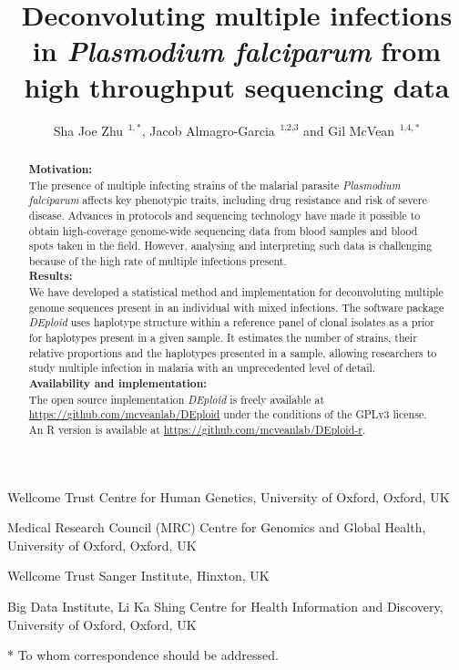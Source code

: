 \documentclass{nature}
\begin{document}
\title{Deconvoluting multiple infections in {\it Plasmodium falciparum} from high throughput sequencing data}
\author{Sha Joe Zhu\,$^{\text{ 1},*}$, Jacob Almagro-Garcia\,$^{\text{ 1,2,3}}$ and Gil McVean\,$^{\text{ 1,4},*}$}

\maketitle

\begin{affiliations}
\item Wellcome Trust Centre for Human Genetics, University of Oxford, Oxford, UK
\item Medical Research Council (MRC) Centre for Genomics and Global Health, University of Oxford, Oxford, UK
\item Wellcome Trust Sanger Institute, Hinxton, UK
\item Big Data Institute, Li Ka Shing Centre for Health Information and Discovery, University of Oxford, Oxford, UK
\item[*] To whom correspondence should be addressed.
\end{affiliations}

\begin{abstract}
\noindent\textbf{Motivation:}  \\ \noindent
The presence of multiple infecting strains of the malarial parasite {\it Plasmodium falciparum} affects  key phenotypic  traits, including drug resistance and risk of severe disease. Advances in protocols and sequencing technology have made it possible  to obtain  high-coverage genome-wide  sequencing data from blood samples and blood spots taken in the field. However, analysing and interpreting such data is challenging  because of the high rate of multiple infections present.\\
\textbf{Results:}  \\ \noindent  We have developed a statistical method and implementation for deconvoluting multiple genome sequences present in an individual with mixed infections.  The software package {\it DEploid} uses haplotype structure within a reference panel of clonal isolates as a prior for haplotypes present in a given sample. It estimates the number of strains, their relative proportions and the haplotypes presented in a sample, allowing researchers to study multiple infection in malaria with an unprecedented level of detail.\\
\textbf{Availability and implementation:}  \\ \noindent  The open source implementation {\it DEploid} is freely available at \href{https://github.com/mcveanlab/DEploid}{https://github.com/mcveanlab/DEploid} under the conditions of the GPLv3 license. \\
An R version is available at \href{https://github.com/mcveanlab/DEploid-r}{https://github.com/mcveanlab/DEploid-r}.\\
\end{abstract}
\end{document}
